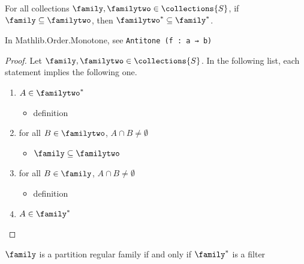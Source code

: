 \begin{theorem}
    \label{thm_dual_is_antitone}
    \leanok{}
    For all collections $\family, \familytwo \in \collections{S}$, if $\family \subseteq \familytwo$, then $\familytwo^* \subseteq \family^*$.
\end{theorem}

\begin{leanrmk}
    In Mathlib.Order.Monotone, see \verb|Antitone (f : a → b)|
\end{leanrmk}

\begin{proof}
    Let $\family, \familytwo \in \collections{S}$. In the following list, each statement implies the following one.
    \begin{enumerate}
        \item $A \in \familytwo^*$
        \begin{itemize}
            \item[--] definition
        \end{itemize}
        \item for all $B \in \familytwo$, $A \cap B \neq \emptyset$
        \begin{itemize}
            \item[--] $\family \subseteq \familytwo$
        \end{itemize}
        \item for all $B \in \family$, $A \cap B \neq \emptyset$
        \begin{itemize}
            \item[--] definition
        \end{itemize}
        \item $A \in \family^*$
    \end{enumerate}
\end{proof}

\begin{theorem}
    \label{thm_pr_iff_dual_is_filter}
    \label{thm_family_pr_iff_dual_is_filter}
    $\family$ is a partition regular family if and only if $\family^*$ is a filter
\end{theorem}

